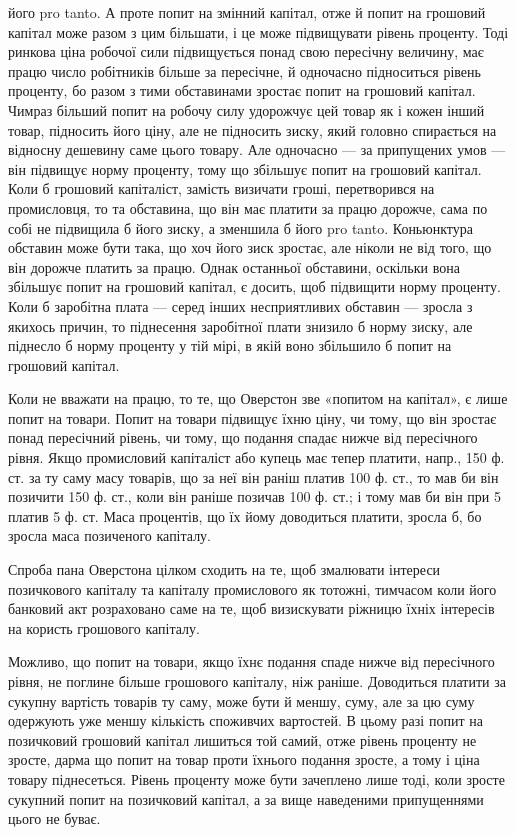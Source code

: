 його pro tanto. А проте попит на змінний капітал, отже й попит на грошовий
капітал може разом з цим більшати, і це може підвищувати рівень проценту.
Тоді ринкова ціна робочої сили підвищується понад свою пересічну величину,
має працю число робітників більше за пересічне, й одночасно підноситься
рівень проценту, бо разом з тими обставинами зростає попит на грошовий капітал.
Чимраз більший попит на робочу силу удорожчує цей товар як і кожен інший товар,
підносить його ціну, але не підносить зиску, який головно спирається на відносну
дешевину саме цього товару. Але одночасно — за припущених умов — він підвищує
норму проценту, тому що збільшує попит на грошовий капітал. Коли б
грошовий капіталіст, замість визичати гроші, перетворився на промисловця, то
та обставина, що він має платити за працю дорожче, сама по собі не підвищила
б його зиску, а зменшила б його pro tanto. Коньюнктура обставин може
бути така, що хоч його зиск зростає, але ніколи не від того, що він дорожче
платить за працю. Однак останньої обставини, оскільки вона збільшує попит на
грошовий капітал, є досить, щоб підвищити норму проценту. Коли б заробітна
плата — серед інших несприятливих обставин — зросла з якихось причин, то
піднесення заробітної плати знизило б норму зиску, але піднесло б норму проценту
у тій мірі, в якій воно збільшило б попит на грошовий капітал.

Коли не вважати на працю, то те, що Оверстон зве «попитом на капітал»,
є лише попит на товари. Попит на товари підвищує їхню ціну, чи тому, що
він зростає понад пересічний рівень, чи тому, що подання спадає нижче від
пересічного рівня. Якщо промисловий капіталіст або купець має тепер платити,
напр., 150 ф. ст. за ту саму масу товарів, що за неї він раніш платив 100
ф. ст., то мав би він позичити 150 ф. ст., коли він раніше позичав 100 ф. ст.;
і тому мав би він при 5%
платив 5 ф. ст. Маса процентів, що їх йому доводиться платити, зросла б,
бо зросла маса позиченого капіталу.

Спроба пана Оверстона цілком сходить на те, щоб змалювати інтереси позичкового
капіталу та капіталу промислового як тотожні, тимчасом коли його
банковий акт розраховано саме на те, щоб визискувати ріжницю їхніх інтересів
на користь грошового капіталу.

Можливо, що попит на товари, якщо їхнє подання спаде нижче від пересічного
рівня, не поглине більше грошового капіталу, ніж раніше. Доводиться
платити за сукупну вартість товарів ту саму, може бути й меншу, суму, але
за цю суму одержують уже меншу кількість споживчих вартостей. В цьому разі
попит на позичковий грошовий капітал лишиться той самий, отже рівень проценту
не зросте, дарма що попит на товар проти їхнього подання зросте, а тому
і ціна товару піднесеться. Рівень проценту може бути зачеплено лише тоді,
коли зросте сукупний попит на позичковий капітал, а за вище наведеними припущеннями цього не буває.

